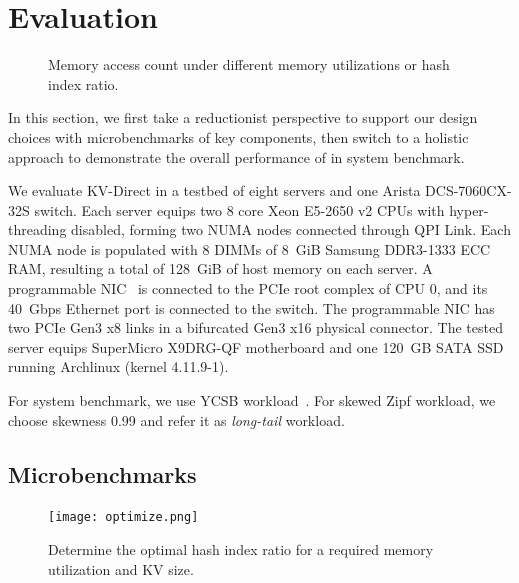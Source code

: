 \section{Evaluation}
\label{kvdirect:sec:eval}

\begin{figure}[t]
\caption{Memory access count under different memory utilizations or hash index ratio.}
\label{kvdirect:fig:memory-access-count}
\end{figure}

\label{kvdirect:sec:evaluation}
In this section, we first take a reductionist perspective to support our design choices with microbenchmarks of key components, then switch to a holistic approach to demonstrate the overall performance of \oursys{} in system benchmark.

\label{kvdirect:sec:evaluation-setup}
We evaluate KV-Direct in a testbed of eight servers and one Arista DCS-7060CX-32S switch.
Each server equips two 8 core Xeon E5-2650 v2 CPUs with hyper-threading disabled, forming two NUMA nodes connected through QPI Link. Each NUMA node is populated with 8 DIMMs of 8~GiB Samsung DDR3-1333 ECC RAM, resulting a total of 128~GiB of host memory on each server.
A programmable NIC~\cite{caulfield2016cloud} is connected to the PCIe root complex of CPU 0, and its 40~Gbps Ethernet port is connected to the switch. The programmable NIC has two PCIe Gen3 x8 links in a bifurcated Gen3 x16 physical connector.
The tested server equips SuperMicro X9DRG-QF motherboard and one 120~GB SATA SSD running Archlinux (kernel 4.11.9-1).

For system benchmark, we use YCSB workload~\cite{cooper2010benchmarking}.
For skewed Zipf workload, we choose skewness 0.99 and refer it as \textit{long-tail} workload.

\subsection{Microbenchmarks}
\label{kvdirect:sec:microbenchmarks}


\begin{figure}[t]
\centering
\texttt{[image: optimize.png]}
\caption{Determine the optimal hash index ratio for a required memory utilization and KV size.}
\label{kvdirect:fig:hashline-ratio}

\end{figure}

